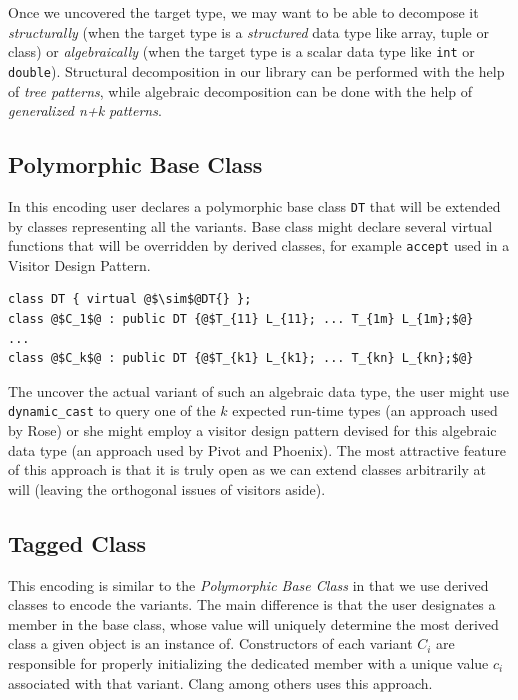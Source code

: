 \documentclass[preprint]{sigplanconf}
\makeatletter
\DeclareRobustCommand{\code}[1]{{\lstinline[breaklines=false,escapechar=@]{#1}}}
\makeatother
\begin{document}
Once we uncovered the target type, we may want to be able to decompose it 
\emph{structurally} (when the target type is a \emph{structured} data type like 
array, tuple or class) or \emph{algebraically} (when the target type is a scalar 
data type like \code{int} or \code{double}). Structural decomposition in our 
library can be performed with the help of \emph{tree patterns}, while algebraic 
decomposition can be done with the help of \emph{generalized n+k patterns}.

\subsection{Polymorphic Base Class}
\label{sec:pbc}

In this encoding user declares a polymorphic base class \code{DT} that will 
be extended by classes representing all the variants. Base class might declare 
several virtual functions that will be overridden by derived classes, for example 
\code{accept} used in a Visitor Design Pattern.

\begin{lstlisting}[keepspaces,columns=flexible]
class DT { virtual @$\sim$@DT{} };
class @$C_1$@ : public DT {@$T_{11} L_{11}; ... T_{1m} L_{1m};$@} 
...
class @$C_k$@ : public DT {@$T_{k1} L_{k1}; ... T_{kn} L_{kn};$@} 
\end{lstlisting}

The uncover the actual variant of such an algebraic data type, the user might 
use \code{dynamic_cast} to query one of the $k$ expected run-time types (an 
approach used by Rose\cite{SQ03}) or she might employ a visitor design pattern 
devised for this algebraic data type (an approach used by Pivot\cite{Pivot09} 
and Phoenix\cite{Phoenix}). The most attractive feature of this approach is that 
it is truly open as we can extend classes arbitrarily at will (leaving the 
orthogonal issues of visitors aside).

\subsection{Tagged Class}
\label{sec:tc}

This encoding is similar to the \emph{Polymorphic Base Class} in that we use 
derived classes to encode the variants. The main difference is that the user 
designates a member in the base class, whose value will uniquely 
determine the most derived class a given object is an instance of. Constructors 
of each variant $C_i$ are responsible for properly initializing the dedicated 
member with a unique value $c_i$ associated with that variant. Clang\cite{Clang} 
among others uses this approach.
\end{document}
